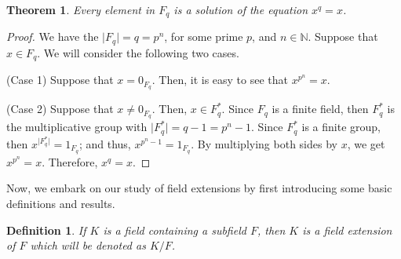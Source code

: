 \documentclass[11pt]{amsart}
\newtheorem{definition}{Definition}
\newtheorem{theorem}{Theorem}
\newcommand{\WTS}{\xRightarrow[]{\text{WTS}}}
\begin{document}
\begin{enumerate}
\begin{theorem}
	Every element in $F_q$ is a solution of the equation $x^q = x$.
\end{theorem}

\begin{proof}
	We have the $\lvert F_q \rvert = q = p^n$, for some prime $p$, and $n \in \mathbb{N}$. Suppose that $x \in F_q$. We will consider the following two cases.
	
	(Case 1) Suppose that $x = 0_{F_q}$. Then, it is easy to see that $x^{p^n} = x$.
	
	(Case 2) Suppose that $x \neq 0_{F_q}$. Then, $x \in F^{\ast}_{q}$. Since $F_q$ is a finite field, then $F^{\ast}_q$ is the multiplicative group with $\lvert F^{\ast}_q \rvert = q - 1 = p^n - 1$. Since $F^{\ast}_q$ is a finite group, then $x^{\lvert F^{\ast}_q \rvert} = 1_{F_q}$; and thus, $x^{p^n - 1} = 1_{F_q} $. By multiplying both sides by $x$, we get $x^{p^n} = x$. Therefore, $x^q = x$. 
\end{proof}

Now, we embark on our study of field extensions by first introducing some basic definitions and results.

\begin{definition}
	If $K$ is a field containing a subfield $F$, then $K$ is a field extension of $F$ which will be denoted as $K / F $.
\end{definition}

\end{enumerate}
%
%
%
%
%
%
%
%
%
%
%
%
%
%
%
%
%
%
%
%
%
\end{document}
